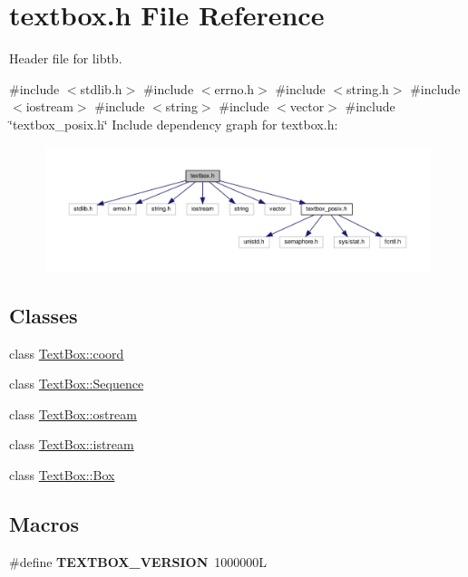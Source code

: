 \hypertarget{a00005}{}\section{textbox.\+h File Reference}
\label{a00005}


Header file for libtb.  


{\ttfamily \#include $<$stdlib.\+h$>$}\newline
{\ttfamily \#include $<$errno.\+h$>$}\newline
{\ttfamily \#include $<$string.\+h$>$}\newline
{\ttfamily \#include $<$iostream$>$}\newline
{\ttfamily \#include $<$string$>$}\newline
{\ttfamily \#include $<$vector$>$}\newline
{\ttfamily \#include \char`\"{}textbox\+\_\+posix.\+h\char`\"{}}\newline
Include dependency graph for textbox.\+h\+:\nopagebreak
\begin{figure}[H]
\begin{center}
\leavevmode
\includegraphics[width=350pt]{a00006}
\end{center}
\end{figure}
\subsection*{Classes}
\begin{DoxyCompactItemize}
\item 
class \hyperlink{a00016}{Text\+Box\+::coord}
\item 
class \hyperlink{a00020}{Text\+Box\+::\+Sequence}
\item 
class \hyperlink{a00024}{Text\+Box\+::ostream}
\item 
class \hyperlink{a00028}{Text\+Box\+::istream}
\item 
class \hyperlink{a00032}{Text\+Box\+::\+Box}
\end{DoxyCompactItemize}
\subsection*{Macros}
\begin{DoxyCompactItemize}
\item 
\mbox{\label{a00005_adad9d59e5ec353f6ba40e43478e4946b}} 
\#define {\bfseries T\+E\+X\+T\+B\+O\+X\+\_\+\+V\+E\+R\+S\+I\+ON}~1000000L
\end{DoxyCompactItemize}
